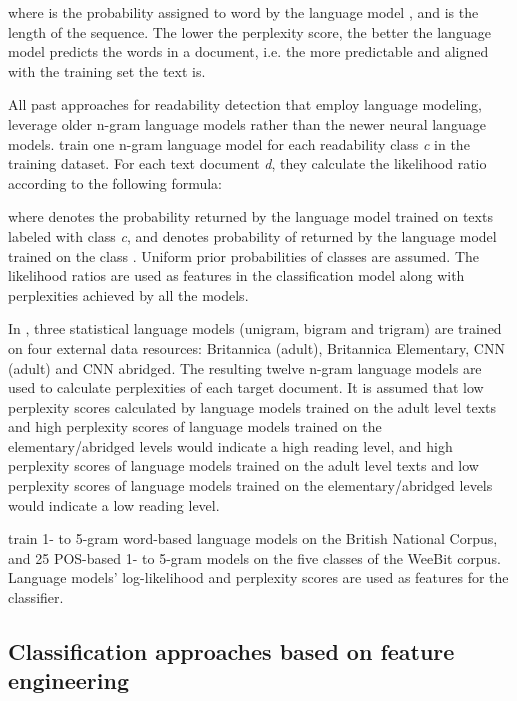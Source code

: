 \documentclass{clv3}
\begin{document}
\noindent 
where  is the probability assigned to word  by the language model , and  is the length of the sequence. The lower the perplexity score, the better the language model predicts the words in a document, i.e. the more predictable and aligned with the training set the text is.

All past approaches for readability detection that employ language modeling, leverage older n-gram language models rather than the newer neural language models. \citet{schwarm2005reading} train one n-gram language model for each readability class \textit{c} in the training dataset. For each text document \textit{d}, they calculate the likelihood ratio according to the following formula:

 
where  denotes the probability returned by the language model trained on texts labeled with class \textit{c}, and  denotes probability of  returned by the language model trained on the class . Uniform prior probabilities of classes are assumed. The likelihood ratios are used as features in the classification model along with perplexities achieved by all the models.

In \citet{petersen2009machine}, three statistical language models (unigram, bigram and trigram) are trained on four external data resources: Britannica (adult), Britannica Elementary, CNN (adult) and CNN abridged. The resulting twelve n-gram language models are used to calculate perplexities of each target document. It is assumed that low perplexity scores calculated by language models trained on the adult level texts and high perplexity scores of language models trained on the elementary/abridged levels would indicate a high reading level, and high perplexity scores of language models trained on the adult level texts and low perplexity scores of language models trained on the elementary/abridged levels would indicate a low reading level.

\citet{xia2016text} train 1- to 5-gram word-based language models on the British National Corpus, and 25 POS-based 1- to 5-gram models on the five classes of the WeeBit corpus. Language models' log-likelihood and perplexity scores are used as features for the classifier. 



\subsection{Classification approaches based on feature engineering}
\label{sec:traditional-classification}
\end{document}
